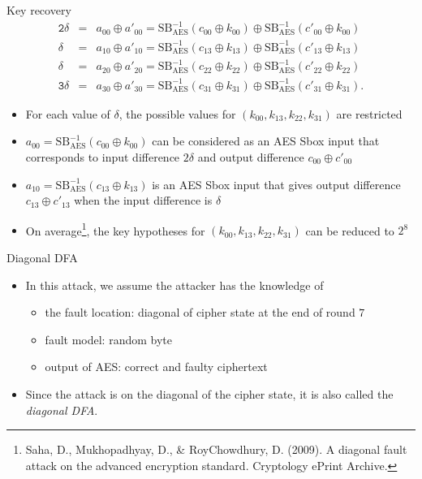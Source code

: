 \begin{frame}{Key recovery}
\begin{eqnarray*}
\texttt{2}\delta &=& a_{00}\oplus a'_{00}=\text{SB}_{\text{AES}}^{-1}(c_{00}\oplus k_{00})\oplus \text{SB}_{\text{AES}}^{-1}(c'_{00}\oplus k_{00})\\
\delta &=& a_{10}\oplus a'_{10}=\text{SB}_{\text{AES}}^{-1}(c_{13}\oplus k_{13})\oplus \text{SB}_{\text{AES}}^{-1}(c'_{13}\oplus k_{13})\\
\delta &=& a_{20}\oplus a'_{20}=\text{SB}_{\text{AES}}^{-1}(c_{22}\oplus k_{22})\oplus \text{SB}_{\text{AES}}^{-1}(c'_{22}\oplus k_{22})\\
\texttt{3}\delta &=& a_{30}\oplus a'_{30}=\text{SB}_{\text{AES}}^{-1}(c_{31}\oplus k_{31})\oplus \text{SB}_{\text{AES}}^{-1}(c'_{31}\oplus k_{31}).
\end{eqnarray*}
\begin{itemize}
    \item For each value of $\delta$, the possible values for $(k_{00},k_{13},k_{22},k_{31})$ are restricted
    \item $a_{00}=\text{SB}_{\text{AES}}^{-1}(c_{00}\oplus k_{00})$ can be considered as an AES Sbox input that corresponds to input difference $2\delta$ and output difference $c_{00}\oplus c'_{00}$
    \item $a_{10}=\text{SB}_{\text{AES}}^{-1}(c_{13}\oplus k_{13})$ is an AES Sbox input that gives output difference $c_{13}\oplus c'_{13}$ when the input difference is $\delta$
    \item On average\footnote{Saha, D., Mukhopadhyay, D., \& RoyChowdhury, D. (2009). A diagonal fault attack on the advanced encryption standard. Cryptology ePrint Archive.}, the key hypotheses for $(k_{00},k_{13},k_{22},k_{31})$ can be reduced to $2^8$
\end{itemize}
\end{frame}

\begin{frame}{Diagonal DFA}
    \begin{itemize}
        \item In this attack, we assume the attacker has the knowledge of
        \begin{itemize}
            \item the fault location: diagonal of cipher state at the end of round $7$
            \item fault model: random byte
            \item output of AES: correct and faulty ciphertext
        \end{itemize}
       \item Since the attack is on the diagonal of the cipher state, it is also called the \textit{diagonal DFA}.
    \end{itemize}
\end{frame}

